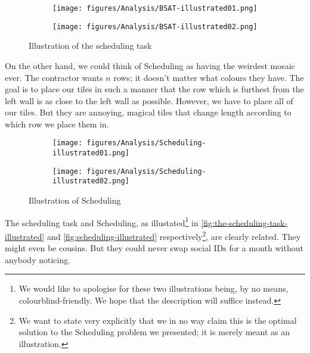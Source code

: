 \begin{figure}[H]
    \centering
    \begin{subfigure}[t]{0.73\textwidth}
        \centering
        \texttt{[image: figures/Analysis/BSAT-illustrated01.png]}
    \end{subfigure}
    \hfill
    \begin{subfigure}[t]{0.225\textwidth}
        \centering
        \texttt{[image: figures/Analysis/BSAT-illustrated02.png]}
    \end{subfigure}
    \caption{Illustration of the scheduling task}
    \label{fig:the-scheduling-task-illustrated}
\end{figure}
On the other hand, we could think of Scheduling as having the weirdest mosaic ever. The contractor wants \(n\) rows; it doesn't matter what colours they have. The goal is to place our tiles in such a manner that the row which is furthest from the left wall is as close to the left wall as possible. However, we have to place all of our tiles. But they are annoying, magical tiles that change length according to which row we place them in.
\begin{figure}[H]
    \centering
    \begin{subfigure}[t]{0.715\textwidth}
        \centering
        \texttt{[image: figures/Analysis/Scheduling-illustrated01.png]}
    \end{subfigure}
    \hfill
    \begin{subfigure}[t]{0.25\textwidth}
        \centering
        \texttt{[image: figures/Analysis/Scheduling-illustrated02.png]}
    \end{subfigure}
    \caption{Illustration of Scheduling}
    \label{fig:scheduling-illustrated}
\end{figure}
The scheduling task and Scheduling, as illustated\footnote{We would like to apologise for these two illustrations being, by no means, colourblind-friendly. We hope that the description will suffice instead.} in \autoref{fig:the-scheduling-task-illustrated} and \autoref{fig:scheduling-illustrated} respectively\footnote{We want to state very explicitly that we in no way claim this is the optimal solution to the Scheduling problem we presented; it is merely meant as an illustration.}, are clearly related. They might even be cousins. But they could never swap social IDs for a month without anybody noticing.

